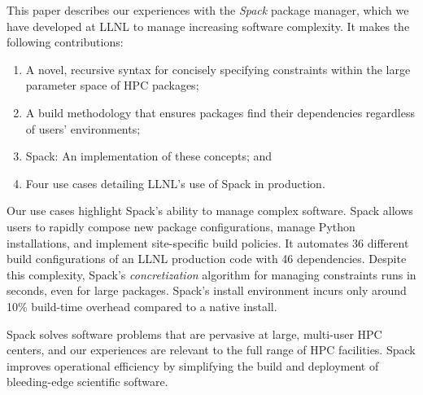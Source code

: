 This paper describes our experiences with the {\it Spack} package manager,
which we have developed at LLNL to manage increasing software complexity.
It makes the following contributions:
\begin{enumerate}
\item A novel, recursive syntax for concisely specifying constraints within
      the large parameter space of HPC packages;
\item A build methodology that ensures packages find their dependencies
      regardless of users' environments;
\item Spack: An implementation of these concepts; and
\item Four use cases detailing LLNL's use of Spack in production.
\end{enumerate}
\noindent
Our use cases highlight Spack's ability to manage complex software.
%
Spack allows users to rapidly compose new package configurations,
manage Python installations, and implement site-specific build policies. 
%
It automates 36 different build configurations of an LLNL
production code with 46 dependencies.
Despite this complexity, Spack's {\it concretization} algorithm
for managing constraints runs in seconds, even for
large packages. Spack's install environment incurs only around
10\% build-time overhead compared to a native install.

Spack solves software problems that are pervasive at large,
multi-user HPC centers, and our experiences are relevant to the
full range of HPC facilities.
Spack improves operational efficiency by simplifying the
build and deployment of bleeding-edge scientific software.  





